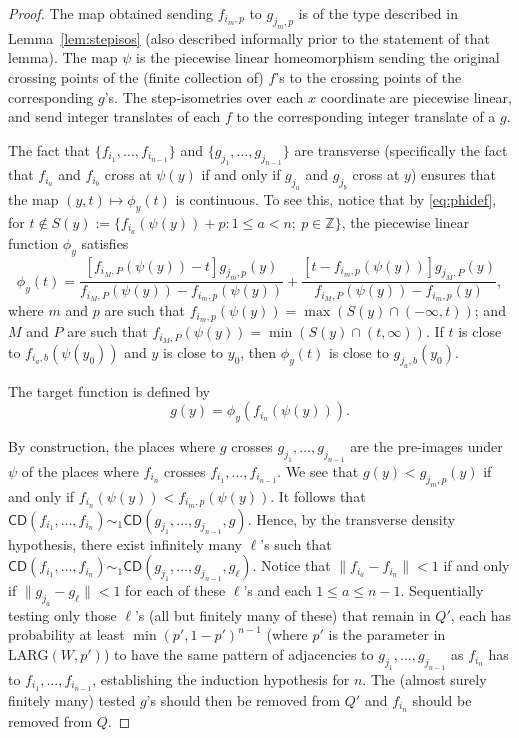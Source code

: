 \documentclass{daj}
\newcommand{\LARG}{\mathrm{LARG}}
\newcommand{\Z}{\mathbb Z}
\newcommand{\CD}{\mathsf{CD}}
\begin{document}
\begin{proof}
The map obtained sending $f_{i_m,p}$ to $g_{j_m,p}$
is of the type described in Lemma~\ref{lem:stepisos} (also
described informally prior to the statement of that lemma).
The map $\psi$ is the piecewise linear homeomorphism sending the original
crossing points of the (finite collection of) $f$'s to the crossing points
of the corresponding $g$'s. The step-isometries over each $x$ coordinate
are piecewise linear, and send integer translates of each $f$ to the corresponding
integer translate of a $g$.

The fact that $\{f_{i_1},\ldots,f_{i_{n-1}}\}$ and
$\{g_{j_1},\ldots,g_{j_{n-1}}\}$ are transverse (specifically the fact
that $f_{i_a}$ and $f_{i_b}$ cross at $\psi(y)$ if and only if
$g_{j_a}$ and $g_{j_b}$ cross at $y$) ensures that the map $(y,t)\mapsto \phi_y(t)$
is continuous. To see this, notice that by \eqref{eq:phidef},
for $t\not\in S(y):=\{f_{i_a}(\psi(y))+p\colon 1\le a<n;\ p\in\Z\}$, the piecewise
linear function $\phi_y$ satisfies
$$
\phi_y(t)=\frac{[f_{i_M,P}(\psi(y))-t]g_{j_m,p}(y)}{f_{i_M,P}(\psi(y))-f_{i_m,p}(\psi(y))}
+
\frac{[t-f_{i_m,p}(\psi(y))]g_{j_M,P}(y)}{f_{i_M,P}(\psi(y))-f_{i_m,p}(y)},
$$
where $m$ and $p$ are such that $f_{i_m,p}(\psi(y))=\max(S(y)\cap (-\infty,t))$;
and $M$ and $P$ are such that
$f_{i_M,P}(\psi(y))=\min(S(y)\cap (t,\infty))$. If $t$ is close to $f_{i_a,b}(\psi(y_0))$
and $y$ is close to $y_0$,
then $\phi_y(t)$ is close to $g_{j_a,b}(y_0)$.

The target function is defined by
$$
g(y)=\phi_y(f_{i_n}(\psi(y))).
$$

By construction, the places where $g$ crosses $g_{j_1},\ldots,g_{j_{n-1}}$ are the pre-images under $\psi$
of the places where $f_{i_n}$ crosses $f_{i_1},\ldots,f_{i_{n-1}}$.
We see that $g(y)<g_{j_m,p}(y)$ if and only if $f_{i_n}(\psi(y))<f_{i_m,p}(\psi(y))$.
It follows that $\CD(f_{i_1},\ldots,f_{i_{n}})\sim_1\CD(g_{j_1},\ldots,g_{j_{n-1}},g)$.
Hence, by the transverse density hypothesis, there exist infinitely many $\ell$'s such that
$\CD(f_{i_1},\ldots,f_{i_{n}})\sim_1\CD(g_{j_1},\ldots,g_{j_{n-1}},g_\ell)$.
Notice that $\|f_{i_a}-f_{i_n}\|<1$ if and only if $\|g_{j_a}-g_\ell\|<1$ for each of these $\ell$'s and
each $1\le a\le n-1$.
Sequentially testing only those $\ell$'s (all but finitely many of these) that remain in $Q'$,
each has probability at least $\min(p',1-p')^{n-1}$ (where $p'$ is the parameter in $\LARG(W,p')$)
to have the same pattern of
adjacencies to $g_{j_1},\ldots,g_{j_{n-1}}$
as $f_{i_n}$ has to $f_{i_1},\ldots,f_{i_{n-1}}$, establishing the induction hypothesis
for $n$. The (almost surely finitely many)
tested $g$'s should then be removed from $Q'$ and $f_{i_n}$ should be removed from $Q$.
\end{proof}
\end{document}
